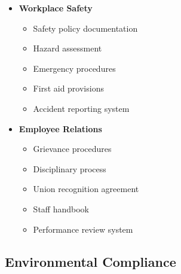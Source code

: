 \begin{tcolorbox}[
    colback=white,
    colframe=primarydark,
    title=\textbf{Labor Law Requirements},
    before skip=1em,
    after skip=1em
]
\begin{itemize}[leftmargin=*,itemsep=0.5em]
        \item \textbf{Workplace Safety}
        \begin{itemize}[itemsep=0.3em]
            \item Safety policy documentation
            \item Hazard assessment
            \item Emergency procedures
            \item First aid provisions
            \item Accident reporting system
        \end{itemize}

        \vspace{0.5em}

        \item \textbf{Employee Relations}
        \begin{itemize}[itemsep=0.3em]
            \item Grievance procedures
            \item Disciplinary process
            \item Union recognition agreement
            \item Staff handbook
            \item Performance review system
        \end{itemize}
    \end{itemize}
\end{tcolorbox}

\subsection{Environmental Compliance}\label{subsec:environmental-compliance}
\vspace{1em}


